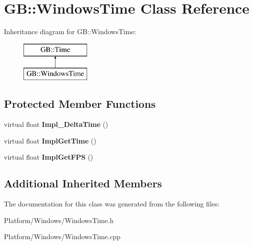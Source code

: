 \hypertarget{class_g_b_1_1_windows_time}{}\section{GB\+::Windows\+Time Class Reference}
\label{class_g_b_1_1_windows_time}
Inheritance diagram for GB\+::Windows\+Time\+:\begin{figure}[H]
\begin{center}
\leavevmode
\includegraphics[height=2.000000cm]{class_g_b_1_1_windows_time}
\end{center}
\end{figure}
\subsection*{Protected Member Functions}
\begin{DoxyCompactItemize}
\item 
\mbox{\label{class_g_b_1_1_windows_time_a6c8ce9d14557b8d2c76b9637085e8a6b}} 
virtual float {\bfseries Impl\+\_\+\+Delta\+Time} ()
\item 
\mbox{\label{class_g_b_1_1_windows_time_a263283e9a2b2b9f0fe043f7e4e4fe92e}} 
virtual float {\bfseries Impl\+Get\+Time} ()
\item 
\mbox{\label{class_g_b_1_1_windows_time_a5afe2a3815d504f8b842234cfd51400f}} 
virtual float {\bfseries Impl\+Get\+F\+PS} ()
\end{DoxyCompactItemize}
\subsection*{Additional Inherited Members}


The documentation for this class was generated from the following files\+:\begin{DoxyCompactItemize}
\item 
Platform/\+Windows/Windows\+Time.\+h\item 
Platform/\+Windows/Windows\+Time.\+cpp\end{DoxyCompactItemize}
